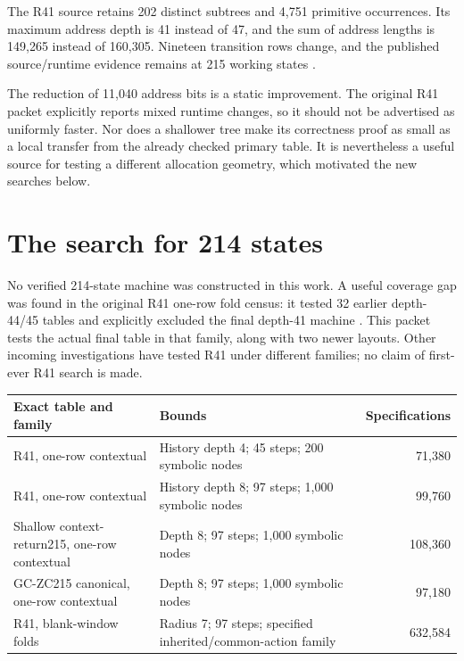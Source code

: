 \documentclass[11pt]{article}
\theoremstyle{remark}
\begin{document}
The R41 source retains 202 distinct subtrees and 4,751 primitive occurrences.
Its maximum address depth is 41 instead of 47, and the sum of address lengths
is 149,265 instead of 160,305. Nineteen transition rows change, and the
published source/runtime evidence remains at 215 working states
\cite{r41}.

The reduction of 11,040 address bits is a static improvement. The original
R41 packet explicitly reports mixed runtime changes, so it should not
be advertised as uniformly faster. Nor does a shallower tree make its
correctness proof as small as a local transfer from the already checked
primary table. It is nevertheless a useful source for testing a different
allocation geometry, which motivated the new searches below.

\section{The search for 214 states}
\label{sec:search}

No verified 214-state machine was constructed in this work. A useful
coverage gap was found in the original R41 one-row fold census: it tested
32 earlier depth-44/45 tables and explicitly excluded the final depth-41
machine \cite{r41}. This packet tests the actual final table in that family,
along with two newer layouts. Other incoming investigations have tested
R41 under different families; no claim of first-ever R41 search is made.

\begin{center}
\small
\begin{tabular}{p{48mm}p{56mm}r}
\toprule
Exact table and family & Bounds & Specifications\\
\midrule
R41, one-row contextual &
History depth 4; 45 steps; 200 symbolic nodes & 71,380\\
R41, one-row contextual &
History depth 8; 97 steps; 1,000 symbolic nodes & 99,760\\
Shallow context-return215, one-row contextual &
Depth 8; 97 steps; 1,000 symbolic nodes & 108,360\\
GC-ZC215 canonical, one-row contextual &
Depth 8; 97 steps; 1,000 symbolic nodes & 97,180\\
R41, blank-window folds &
Radius 7; 97 steps; specified inherited/common-action family & 632,584\\
\bottomrule
\end{tabular}
\end{center}
\end{document}
